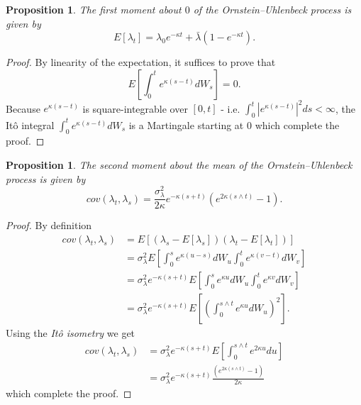 \documentclass{article}
\newtheorem{prop}[thm]{Proposition}
\newtheorem{lem}[thm]{Lemma}
\theoremstyle{definition}
\theoremstyle{remark}
\newcommand{\filtration}[1]{\ensuremath{\mathscr{F}_{#1}}}
\newcommand{\Ito}{It\^{o} }
\begin{document}
\begin{prop}
The first moment about $0$ of the Ornstein--Uhlenbeck process is given by
\begin{equation*}
E[\lambda_t]=\lambda_0e^{-\kappa t}+\bar{\lambda}(1-e^{-\kappa t}).
\end{equation*}
\end{prop}
\begin{proof}
By linearity of the expectation, it suffices to prove that
\begin{equation*}
E\left[\int_0^t e^{\kappa (s-t)} dW_s\right]=0.
\end{equation*}
Because $e^{\kappa (s-t)}$ is square-integrable over $[0, t]$ - i.e. $\int_0^t \left| e^{\kappa (s-t)} \right|^2 ds < \infty$,  the \Ito integral $\int_0^t e^{\kappa (s-t)} dW_s$ is a Martingale starting at $0$ which complete the proof.
\end{proof}

\begin{prop}
The second moment about the mean of the Ornstein--Uhlenbeck process is given by
\begin{equation*}
cov(\lambda_t, \lambda_s)=\frac{\sigma_\lambda^2}{2\kappa} e^{-\kappa(s+t)} (e^{2\kappa (s\wedge t)}-1).
\end{equation*}
\end{prop}
\begin{proof}
By definition
\begin{align*}
cov(\lambda_t, \lambda_s)&=E[(\lambda_s-E[\lambda_s])(\lambda_t-E[\lambda_t])]\\
&=\sigma_\lambda^2E\left[\int_0^s e^{\kappa (u-s)} dW_u\int_0^t e^{\kappa (v-t)} dW_v\right]\\
&=\sigma_\lambda^2e^{-\kappa(s+t)}E\left[\int_0^s e^{\kappa u} dW_u\int_0^t e^{\kappa v} dW_v\right]\\
&=\sigma_\lambda^2e^{-\kappa(s+t)}E\left[\left( \int_0^{s\wedge t} e^{\kappa u} dW_u \right)^2\right].
\end{align*}
Using the \emph{\Ito isometry} we get
\begin{align*}
cov(\lambda_t, \lambda_s)&=\sigma_\lambda^2e^{-\kappa(s+t)}E\left[\int_0^{s\wedge t} e^{2\kappa u} du \right]\\
&=\sigma_\lambda^2e^{-\kappa(s+t)} \frac{(e^{2\kappa (s\wedge t)}-1)}{2\kappa}
\end{align*}
which complete the proof.
\end{proof}
\end{document}
